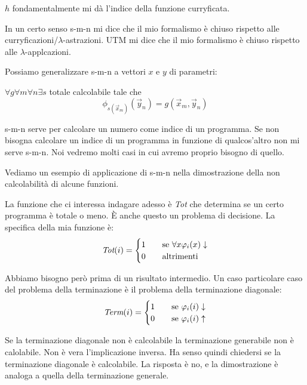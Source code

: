 $h$ fondamentalmente mi dà l'indice della funzione curryficata.

In un certo senso s-m-n mi dice che il mio formalismo è chiuso rispetto alle
curryficazioni/$\lambda$-astrazioni. UTM mi dice che il mio formalismo è chiuso rispetto alle
$\lambda$-applcazioni.

Possiamo generalizzare s-m-n a vettori $x$ e $y$ di parametri: 
\begin{thm}
    $\forall g \forall m \forall n \exists s$ totale calcolabile tale che
    \begin{equation*}
        \phi_{s(\vec{x}_{m})}(\vec{y}_{n}) = g(\vec{x}_{m},\vec{y}_{n})
    \end{equation*}
\end{thm}

s-m-n serve per calcolare un numero come indice di un programma. Se non bisogna calcolare un indice
di un programma in funzione di qualcos'altro non mi serve s-m-n. Noi vedremo molti casi in cui
avremo proprio bisogno di quello.

Vediamo un esempio di applicazione di s-m-n nella dimostrazione della non calcolabilità di alcune
funzioni.

La funzione che ci interessa indagare adesso è \textit{Tot} che determina se un certo programma è
totale o meno. È anche questo un problema di decisione. La specifica della mia funzione è:
\begin{equation*}
    \textit{Tot}(i) =
    \begin{cases}
        1 \quad &\text{se $\forall x \varphi_{i}(x) \downarrow$} \\
        0 \quad &\text{altrimenti}
    \end{cases}
\end{equation*}

Abbiamo bisogno però prima di un risultato intermedio. Un caso particolare caso del problema della
terminazione è il problema della terminazione diagonale:
\begin{equation*}
    \textit{Term}(i) =
    \begin{cases}
        1 \quad &\text{se $\varphi_{i}(i) \downarrow$} \\
        0 \quad &\text{se $\varphi_{i}(i) \uparrow$} \\
    \end{cases}
\end{equation*}

Se la terminazione diagonale non è calcolabile la terminazione generabile non è calolabile. Non è
vera l'implicazione inversa. Ha senso quindi chiedersi se la terminazione diagonale è calcolabile.
La risposta è no, e la dimostrazione è analoga a quella della terminazione generale.

